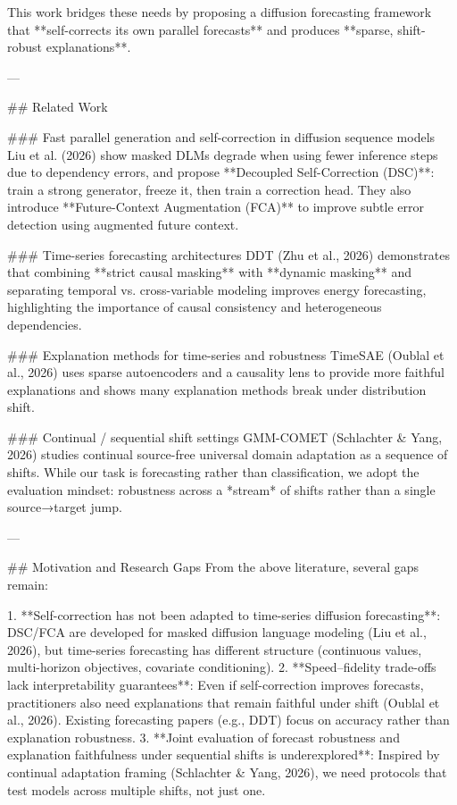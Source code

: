 This work bridges these needs by proposing a diffusion forecasting framework that **self-corrects its own parallel forecasts** and produces **sparse, shift-robust explanations**.

---

## Related Work  

### Fast parallel generation and self-correction in diffusion sequence models  
Liu et al. (2026) show masked DLMs degrade when using fewer inference steps due to dependency errors, and propose **Decoupled Self-Correction (DSC)**: train a strong generator, freeze it, then train a correction head. They also introduce **Future-Context Augmentation (FCA)** to improve subtle error detection using augmented future context.

### Time-series forecasting architectures  
DDT (Zhu et al., 2026) demonstrates that combining **strict causal masking** with **dynamic masking** and separating temporal vs. cross-variable modeling improves energy forecasting, highlighting the importance of causal consistency and heterogeneous dependencies.

### Explanation methods for time-series and robustness  
TimeSAE (Oublal et al., 2026) uses sparse autoencoders and a causality lens to provide more faithful explanations and shows many explanation methods break under distribution shift.

### Continual / sequential shift settings  
GMM-COMET (Schlachter & Yang, 2026) studies continual source-free universal domain adaptation as a sequence of shifts. While our task is forecasting rather than classification, we adopt the evaluation mindset: robustness across a *stream* of shifts rather than a single source→target jump.

---

## Motivation and Research Gaps  
From the above literature, several gaps remain:

1. **Self-correction has not been adapted to time-series diffusion forecasting**: DSC/FCA are developed for masked diffusion language modeling (Liu et al., 2026), but time-series forecasting has different structure (continuous values, multi-horizon objectives, covariate conditioning).  
2. **Speed–fidelity trade-offs lack interpretability guarantees**: Even if self-correction improves forecasts, practitioners also need explanations that remain faithful under shift (Oublal et al., 2026). Existing forecasting papers (e.g., DDT) focus on accuracy rather than explanation robustness.  
3. **Joint evaluation of forecast robustness and explanation faithfulness under sequential shifts is underexplored**: Inspired by continual adaptation framing (Schlachter & Yang, 2026), we need protocols that test models across multiple shifts, not just one.

